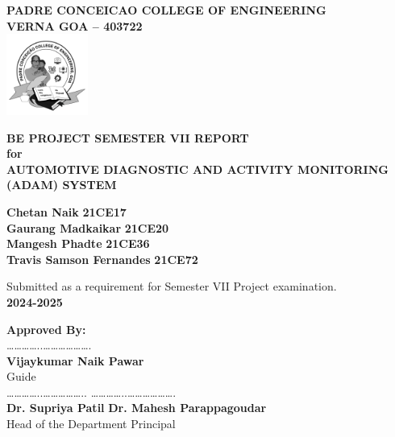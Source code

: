 \documentclass[12pt,a4paper]{report}
\begin{document}
\newpage
\thispagestyle{empty} %
\centering
{\large \textbf{PADRE CONCEICAO COLLEGE OF ENGINEERING}}\\[0.3cm]
{\large \textbf{VERNA GOA -- 403722}}\\[0.1cm]
\includegraphics[width=0.2\textwidth]{assets/logo.png}

{\large \textbf{BE PROJECT SEMESTER VII REPORT}}\\[0.3cm]
{\large \textbf{for}}\\[0.3cm]
{\large \textbf{AUTOMOTIVE DIAGNOSTIC AND ACTIVITY MONITORING (ADAM) SYSTEM}}\\[0.5cm]

\begin{center}
    \normalsize
        {\textbf{Chetan Naik}} \hspace{3.2cm} {\textbf{21CE17}}\\[0.1cm]
        {\textbf{Gaurang Madkaikar}} \hspace{1.8cm} {\textbf{21CE20}}\\[0.1cm]
        {\textbf{Mangesh Phadte}} \hspace{2.5cm} {\textbf{21CE36}}\\[0.1cm]
        {\textbf{Travis Samson Fernandes}} \hspace{0.7cm} {\textbf{21CE72}}
\end{center}

{\large {Submitted as a requirement for Semester VII Project examination.}}\\[0.5cm]
{\large \textbf{2024-2025}}\\[0.2cm]

\raggedright
\textbf{Approved By:}\\[0.8cm]
\hspace{1cm} …………..……………….\\           
\hspace{1cm} \textbf{Vijaykumar Naik Pawar}\\
\hspace{1cm} \hspace{1cm} Guide\\[0.8cm]

\hspace{1cm} …………..…………….. \hspace{1cm} …………..……………….\\
\hspace{1cm} \textbf{Dr. Supriya Patil} \hspace{3.5cm} \textbf{Dr. Mahesh Parappagoudar}\\
\hspace{1cm} Head of the Department \hspace{4cm} Principal\\[0.5cm]
\end{document}
